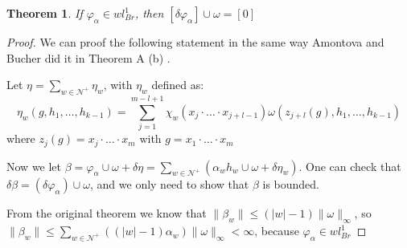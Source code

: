 \documentclass[leqno]{article}
\newtheorem*{theorem}{Theorem}
\newtheorem*{lemma}{Lemma}
\begin{document}
\begin{theorem} If $\varphi _\alpha \in wl^1_{Br}$, then $[\delta \varphi _\alpha ]\cup \omega =[0]$
\end{theorem}
\begin{proof}
  We can proof the following statement in the same way Amontova and Bucher did it in Theorem A (b) \cite{amontova}.

Let $\eta = \sum_{w\in \mathcal{N}^+}\eta_w$, with $\eta_w$ defined as:
\[
  \eta_w (g, h_1, \ldots, h_{k-1}) = \sum_{j=1}^{m-l+1} \chi _w (x_j\cdot \ldots\cdot x_{j+l-1})\omega (z_{j+l}(g), h_1, \ldots, h_{k-1})
\] 
where $z_j(g)=x_j \cdot  \ldots \cdot x_m$ with $g = x_1\cdot \ldots \cdot x_m$

Now we let $\beta = \varphi_\alpha \cup \omega +\delta \eta = \sum_{w\in \mathcal{N}^+}\left( \alpha _w h_w \cup \omega +\delta\eta_w \right)$. One can check that $\delta \beta = (\delta \varphi _\alpha )\cup \omega $, and we only need to show that $\beta $ is bounded.

From the original theorem we know that $\|\beta _w\| \le (|w|-1)\|\omega \|_{\infty}$, so $\|\beta _w\|\le \sum_{w\in \mathcal{N}^+}((|w|-1)\alpha _w)\|\omega \|_{\infty}<\infty$, because $\varphi _\alpha \in wl^1_{Br}$
\end{proof}

\begin{comment}
\section{Some properties of cocycles}

\begin{lemma} Let  $k>0$ even. Then if  $\omega \in C^k(F, \mathbb{R})$ is a cocycle, $\lambda := \omega + A$, with $A\in \mathbb{R}$ is also a cocycle.
\end{lemma}
\begin{proof} 
  \begin{align*}
	&\delta \lambda (h_1, \ldots, h_{k+1}) = \lambda(h_2,\ldots,h_{k+1}) + \sum _{j=1}^k \lambda (h_1, \ldots, h_jh_{j+1}, \ldots, h(k+1)) - \lambda(h_1, \ldots, h_k) =  \\
	&= \omega (h_2,\ldots,h_{k+1}) + A + \sum _{j=1}^k( \omega (h_1, \ldots, h_jh_{j+1}, \ldots, h(k+1))+A) - \omega (h_1, \ldots, h_k) -A = \delta \omega (h_1, \ldots, h_{k+1}) = 0
  \end{align*}
\end{proof}
\end{comment}




\end{document}
